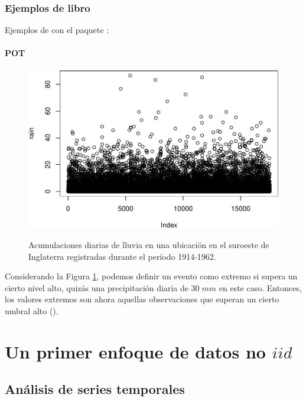 \documentclass[
  20pt,
]{book}
\theoremstyle{definition}
\theoremstyle{definition}
\theoremstyle{definition}
\theoremstyle{definition}
\theoremstyle{remark}
\begin{document}
\subsection{Ejemplos de libro}\label{ejemplos-de-libro}

Ejemplos de \citet{coles2001introduction} con el paquete \citet{ismev2020} :

\subsubsection{POT}\label{pot}

\begin{figure}

{\centering \includegraphics[width=0.8\linewidth,alt={Acumulaciones diarias de lluvia en una ubicación en el suroeste de Inglaterra registradas durante el período 1914-1962.}]{Extremales_files/figure-latex/nice-fig3-1} 

}

\caption{Acumulaciones diarias de lluvia en una ubicación en el suroeste de Inglaterra registradas durante el período 1914-1962.}\label{fig:nice-fig3}
\end{figure}

Considerando la Figura \ref{fig:nice-fig3}, podemos definir un evento como extremo si supera un cierto nivel alto, quizás una precipitación diaria de \(30\; mm\) en este caso. Entonces, los valores extremos son ahora aquellas observaciones que superan un cierto umbral alto (\citet{coles2001introduction}).

\chapter{\texorpdfstring{Un primer enfoque de datos no \(iid\)}{Un primer enfoque de datos no iid}}\label{cross}

\section{Análisis de series temporales}\label{anuxe1lisis-de-series-temporales}
\end{document}
